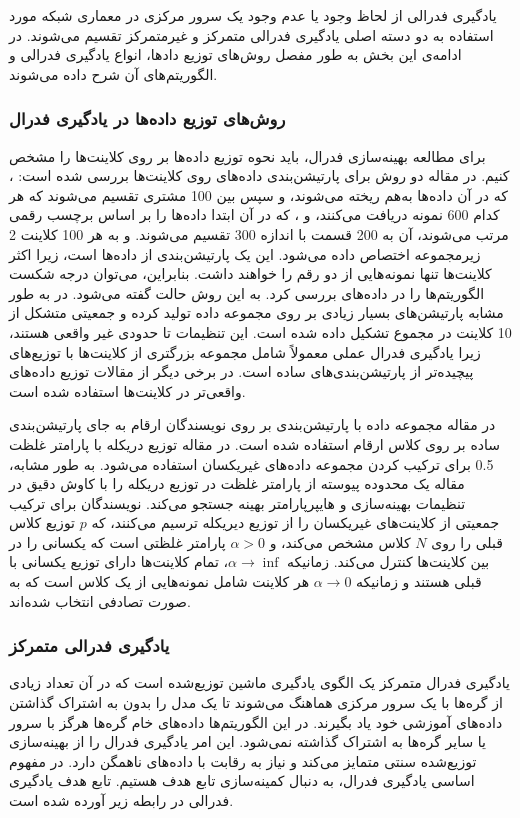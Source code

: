 یادگیری فدرالی از لحاظ وجود یا عدم وجود یک سرور مرکزی در معماری شبکه مورد استفاده به دو دسته اصلی یادگیری فدرالی متمرکز و غیرمتمرکز تقسیم می‌شوند. در ادامه‌ی این بخش به طور مفصل روش‌های توزیع دادها، انواع یادگیری فدرالی و الگوریتم‌های آن‌ شرح داده می‌شوند.
\subsubsection{روش‌های توزیع‌ داده‌ها در یادگیری فدرال}
برای مطالعه بهینه‌سازی فدرال، باید نحوه توزیع داده‌ها بر روی کلاینت‌ها را مشخص کنیم. در مقاله \cite{Fed1} دو روش برای پارتیشن‌بندی داده‌های  روی کلاینت‌ها بررسی شده است: ، که در آن داده‌ها به‌هم ریخته می‌شوند، و سپس بین 100 مشتری تقسیم می‌شوند که هر کدام 600 نمونه دریافت می‌کنند، و ، که در آن ابتدا داده‌ها را بر اساس برچسب رقمی مرتب می‌شوند، آن به 200 قسمت با اندازه 300 تقسیم می‌شوند. و به هر 100 کلاینت 2 زیرمجموعه اختصاص داده می‌شود. این یک پارتیشن‌بندی  از داده‌ها است، زیرا اکثر کلاینت‌ها تنها نمونه‌هایی از دو رقم را خواهند داشت. بنابراین، می‌توان درجه شکست الگوریتم‌ها را در داده‌های  بررسی کرد. به این روش حالت  گفته می‌شود. در \cite{Fed2} به طور مشابه پارتیشن‌های بسیار زیادی بر روی مجموعه داده  تولید کرده و جمعیتی متشکل از 10 کلاینت در مجموع تشکیل داده شده است. این تنظیمات تا حدودی غیر واقعی هستند، زیرا یادگیری فدرال عملی معمولاً شامل مجموعه بزرگتری از کلاینت‌ها با توزیع‌های پیچیده‌تر از پارتیشن‌بندی‌های ساده است. در برخی دیگر از مقالات توزیع داده‌های واقعی‌تر در کلاینت‌ها استفاده شده است. 

در مقاله \cite{Fed3} مجموعه داده  با پارتیشن‌بندی بر روی نویسندگان ارقام به جای پارتیشن‌بندی ساده بر روی کلاس ارقام استفاده شده است. در مقاله \cite{Fed4} توزیع دریکله با پارامتر غلظت 0.5 برای ترکیب کردن مجموعه داده‌های غیریکسان استفاده می‌شود. به طور مشابه، مقاله \cite{Fed5} یک محدوده پیوسته از پارامتر غلظت در توزیع دریکله را با کاوش دقیق در تنظیمات بهینه‌سازی و هایپرپارامتر بهینه جستجو می‌کند. نویسندگان برای ترکیب جمعیتی از کلاینت‌های غیریکسان را از توزیع دیریکله ترسیم می‌کنند، که $p$ توزیع کلاس قبلی را روی $N$ کلاس مشخص می‌کند، و $α > 0$ پارامتر غلظتی است که یکسانی را در بین کلاینت‌ها کنترل می‌کند. زمانیکه $\alpha\to \inf$، تمام کلاینت‌ها دارای توزیع یکسانی با قبلی هستند و زمانیکه $\alpha\to 0$ هر کلاینت شامل نمونه‌هایی از یک کلاس است که به صورت تصادفی انتخاب شده‌اند.

\subsubsection{یادگیری فدرالی متمرکز}
یادگیری فدرال متمرکز یک الگوی یادگیری ماشین توزیع‌شده است که در آن تعداد زیادی از گره‌ها با یک سرور مرکزی هماهنگ می‌شوند تا یک مدل را بدون به اشتراک گذاشتن داده‌های آموزشی خود یاد بگیرند. در این الگوریتم‌ها داده‌های خام گره‌ها هرگز با سرور یا سایر گره‌ها به اشتراک گذاشته نمی‌شود. این امر یادگیری فدرال را از بهینه‌سازی توزیع‌شده سنتی متمایز می‌کند و نیاز به رقابت با داده‌های ناهمگن دارد. در مفهوم اساسی یادگیری فدرال، به دنبال کمینه‌سازی تابع هدف هستیم. تابع هدف یادگیری فدرالی در رابطه زیر آورده شده است. 

